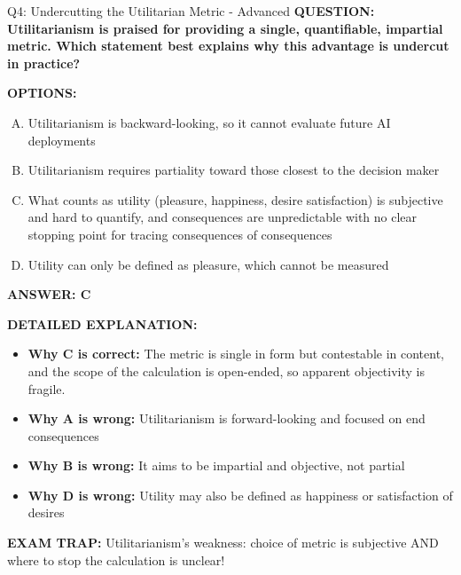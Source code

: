 \documentclass[8pt]{beamer}
\begin{document}
\begin{frame}[shrink=6]{Q4: Undercutting the Utilitarian Metric - Advanced}
\fontsize{6.5}{7.5}\selectfont
\textbf{QUESTION: Utilitarianism is praised for providing a single, quantifiable, impartial metric. Which statement best explains why this advantage is undercut in practice?}

\vspace{0.1cm}
\textbf{OPTIONS:}
\begin{enumerate}[A.]
\item Utilitarianism is backward-looking, so it cannot evaluate future AI deployments
\item Utilitarianism requires partiality toward those closest to the decision maker
\item What counts as utility (pleasure, happiness, desire satisfaction) is subjective and hard to quantify, and consequences are unpredictable with no clear stopping point for tracing consequences of consequences
\item Utility can only be defined as pleasure, which cannot be measured
\end{enumerate}

\vspace{0.1cm}
\textcolor{myblue}{\textbf{ANSWER: C}}

\vspace{0.1cm}
\textbf{DETAILED EXPLANATION:}
\begin{itemize}
\item \textbf{Why C is correct:} The metric is single in form but contestable in content, and the scope of the calculation is open-ended, so apparent objectivity is fragile.
\item \textbf{Why A is wrong:} Utilitarianism is forward-looking and focused on end consequences
\item \textbf{Why B is wrong:} It aims to be impartial and objective, not partial
\item \textbf{Why D is wrong:} Utility may also be defined as happiness or satisfaction of desires
\end{itemize}

\textcolor{myred}{\textbf{EXAM TRAP:}} Utilitarianism's weakness: choice of metric is subjective AND where to stop the calculation is unclear!
\end{frame}
\end{document}
